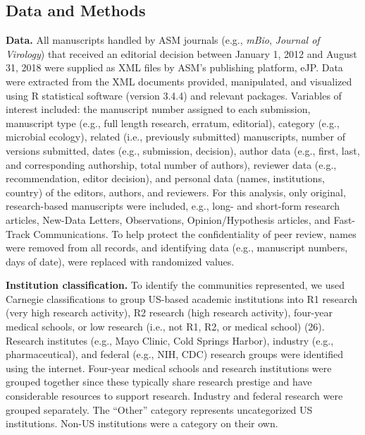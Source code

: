 \documentclass[11pt,]{article}
\begin{document}
\subsection{Data and Methods}\label{data-and-methods}

\textbf{Data.} All manuscripts handled by ASM journals (e.g.,
\emph{mBio}, \emph{Journal of Virology}) that received an editorial
decision between January 1, 2012 and August 31, 2018 were supplied as
XML files by ASM's publishing platform, eJP. Data were extracted from
the XML documents provided, manipulated, and visualized using R
statistical software (version 3.4.4) and relevant packages. Variables of
interest included: the manuscript number assigned to each submission,
manuscript type (e.g., full length research, erratum, editorial),
category (e.g., microbial ecology), related (i.e., previously submitted)
manuscripts, number of versions submitted, dates (e.g., submission,
decision), author data (e.g., first, last, and corresponding authorship,
total number of authors), reviewer data (e.g., recommendation, editor
decision), and personal data (names, institutions, country) of the
editors, authors, and reviewers. For this analysis, only original,
research-based manuscripts were included, e.g., long- and short-form
research articles, New-Data Letters, Observations, Opinion/Hypothesis
articles, and Fast-Track Communications. To help protect the
confidentiality of peer review, names were removed from all records, and
identifying data (e.g., manuscript numbers, days of date), were replaced
with randomized values.

\textbf{Institution classification.} To identify the communities
represented, we used Carnegie classifications to group US-based academic
institutions into R1 research (very high research activity), R2 research
(high research activity), four-year medical schools, or low research
(i.e., not R1, R2, or medical school) (26). Research institutes (e.g.,
Mayo Clinic, Cold Springs Harbor), industry (e.g., pharmaceutical), and
federal (e.g., NIH, CDC) research groups were identified using the
internet. Four-year medical schools and research institutions were
grouped together since these typically share research prestige and have
considerable resources to support research. Industry and federal
research were grouped separately. The ``Other'' category represents
uncategorized US institutions. Non-US institutions were a category on
their own.
\end{document}
